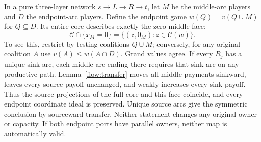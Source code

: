 \documentclass[11pt]{article}
\theoremstyle{remark}
\newcommand{\core}{\mathcal C}
\begin{document}
In a pure three-layer network $s\to L\to R\to t$, let $M$ be the
middle-arc players and $D$ the endpoint-arc players. Define the endpoint
game $w(Q)=v(Q\cup M)$ for $Q\subseteq D$. Its entire core describes
exactly the zero-middle face:
\begin{equation}\label{flow:face}
 \core\cap\{x_M=0\}=\{(z,0_M):z\in\core(w)\}.
\end{equation}
To see this, restrict by testing coalitions $Q\cup M$; conversely, for
any original coalition $A$ use
$v(A)\le w(A\cap D)$. Grand values agree. If every $R_j$ has a unique
sink arc, each middle arc ending there requires that sink arc on any
productive path. Lemma~\ref{flow:transfer} moves all middle payments
sinkward, leaves every source payoff unchanged, and weakly increases
every sink payoff. Thus the source projections of the full core and
this face coincide, and every endpoint coordinate ideal is preserved.
Unique source arcs give the symmetric conclusion by sourceward transfer.
Neither statement changes any original owner or capacity. If both
endpoint ports have parallel owners, neither map is automatically valid.
\end{document}
